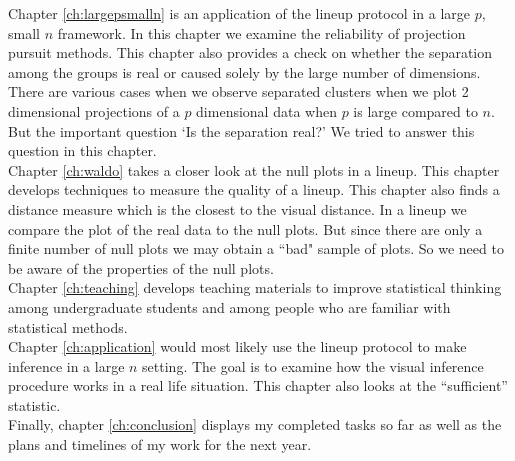 \documentclass[12]{report}
\begin{document}
Chapter \ref{ch:largepsmalln} is an application of the lineup protocol in a large $p$, small $n$ framework. In this chapter we examine the reliability of projection pursuit methods. This chapter also provides a check on whether the separation among the groups is real or caused solely by the large number of dimensions. There are various cases when we observe separated clusters when we plot 2 dimensional projections of a $p$ dimensional data when $p$ is large compared to $n$. But the important question `Is the separation real?' We tried to answer this question in this chapter. \\

Chapter \ref{ch:waldo} takes a closer look at the null plots in a lineup. This chapter develops techniques to measure the quality of a lineup. This chapter also finds a distance measure which is the closest to the visual distance. In a lineup we compare the plot of the real data to the null plots. But since there are only a finite number of null plots we may obtain a ``bad" sample of plots. So we need to be aware of the properties of the null plots. \\

Chapter \ref{ch:teaching} develops teaching materials to improve statistical thinking among undergraduate students and among people who are familiar with statistical methods. \\ 

Chapter \ref{ch:application} would most likely use the lineup protocol to make inference in a large $n$ setting. The goal is to examine how the visual inference procedure works in a real life situation. This chapter also looks at the ``sufficient'' statistic. \\

Finally, chapter \ref{ch:conclusion} displays my completed tasks so far as well as the plans and timelines of my work for the next year. 
\end{document}
